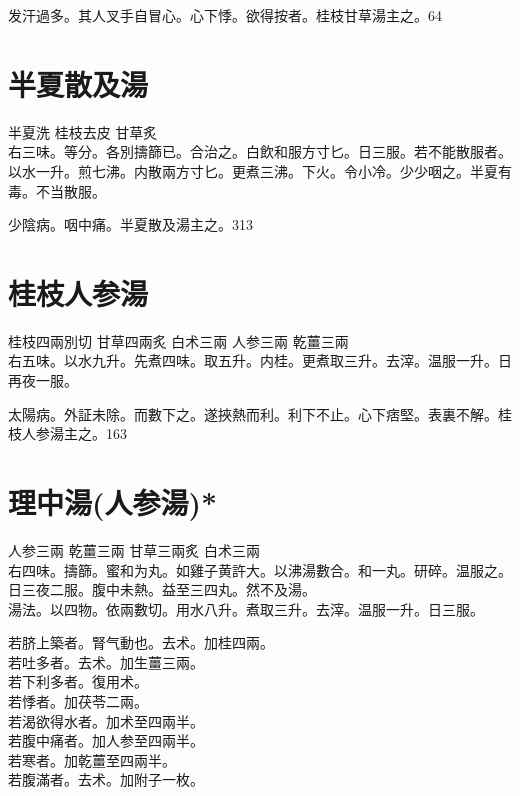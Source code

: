 发汗過多。其人叉手自冒心。心下悸。欲得按者。桂枝甘草湯主之。64

\section{半夏散及湯}

半夏{\scriptsize 洗} 桂枝{\scriptsize 去皮} 甘草{\scriptsize 炙}\\
右三味。等分。各別擣篩已。合治之。白飲和服方寸匕。日三服。若不能散服者。以水一升。煎七沸。内散兩方寸匕。更煮三沸。下火。令小冷。少少咽之。半夏有毒。不当散服。

少陰病。咽中痛。半夏散及湯主之。313

\section{桂枝人参湯}

桂枝{\scriptsize 四兩別切} 甘草{\scriptsize 四兩炙} 白术{\scriptsize 三兩} 人参{\scriptsize 三兩} 乾薑{\scriptsize 三兩}\\
右五味。以水九升。先煮四味。取五升。内桂。更煮取三升。去滓。温服一升。日再夜一服。

太陽病。外証未除。而數下之。遂挾熱而利。利下不止。心下痞堅。表裏不解。桂枝人参湯主之。163

\section{理中湯(人参湯)*}

人参{\scriptsize 三兩} 乾薑{\scriptsize 三兩} 甘草{\scriptsize 三兩炙} 白术{\scriptsize 三兩}\\
右四味。擣篩。蜜和为丸。如雞子黄許大。以沸湯數合。和一丸。研碎。温服之。日三夜二服。腹中未熱。益至三四丸。然不及湯。\\
湯法。以四物。依兩數切。用水八升。煮取三升。去滓。温服一升。日三服。

{\khaai 若}脐上築者。腎气動也。去术。加桂四兩。\\
{\khaai 若}吐多者。去术。加生薑三兩。\\
{\khaai 若}下{\khaai 利}多者。復用术。\\
{\khaai 若}悸者。加茯苓二兩。\\
{\khaai 若}渴{\khaai 欲得水}者。加术至四兩半。\\
{\khaai 若}腹中痛者。加人参至四兩半。\\
{\khaai 若}寒者。加乾薑至四兩半。\\
{\khaai 若}腹滿者。去术。加附子一枚。\\

